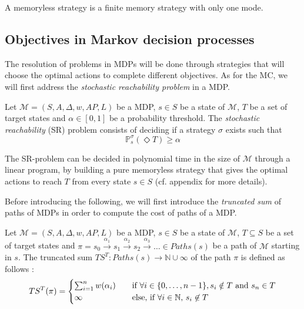\begin{property}
  A memoryless strategy is a finite memory strategy with only one mode.
\end{property}

\subsection{Objectives in Markov decision processes}
The resolution of problems in MDPs will be done through strategies that will choose the optimal actions to complete different objectives. As for the MC, we will first address the \textit{stochastic reachability problem} in a MDP.
\begin{definition}
  Let $\mathcal{M}=(S, A, \Delta, w, AP, L)$ be a MDP, $s \in S$ be a state of $\mathcal{M}$, $T$ be a set of target states and $\alpha \in [0, 1]$ be
  a probability threshold. The \textit{stochastic reachability} (SR) problem consists
  of deciding if a strategy $\sigma$ exists such that
  \[
    \mathbb{P}_s^\sigma(\Diamond T) \geq \alpha
  \]
\end{definition}

\begin{theorem}
  The SR-problem can be decided in polynomial time in the size of $\mathcal{M}$
  through a linear program, by building a pure memoryless strategy that gives the optimal actions to reach $T$ from every state $s \in S$ (cf. appendix for more details).
\end{theorem}

Before introducing the following, we will first introduce the \textit{truncated sum} of paths of MDPs in order to compute the cost of paths of a MDP.

\begin{definition}
	Let $\mathcal{M} = (S, A, \Delta, w, AP, L)$ be a MDP, $s \in S$ be a state of $\mathcal{M}$, $T \subseteq S$ be a set of target states and
	$\pi = s_0 \xrightarrow{\alpha_1} s_1 \xrightarrow{\alpha_2} s_2 \xrightarrow{\alpha_3} \dots \in Paths(s)$ be a path of
	$\mathcal{M}$ starting in $s$. The truncated sum $TS^T : Paths(s)
	\rightarrow \mathbb{N} \cup {\infty}$ of the path $\pi$ is defined as follows :
	\[
		TS^T(\pi) =
		\begin{cases}
			\sum_{i = 1}^{n} w(\alpha_i) & \quad \text{if } \forall i \in \{0, \dots, n - 1\}, s_i \notin T \text{ and } s_n \in T \\
			\infty & \quad \text{else, if $ \forall i \in \mathbb{N}, \, s_i \not\in T$}
		\end{cases}
	\]

\end{definition}

